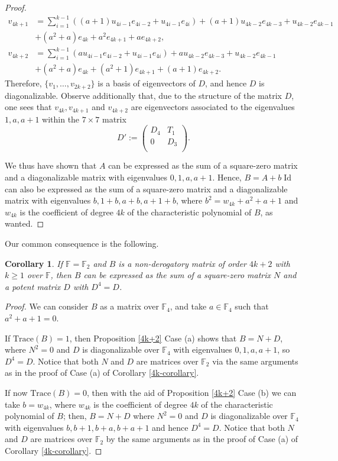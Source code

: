 \documentclass{amsart}
\DeclareMathOperator{\Id}{Id}
\def\FF{\mathbb{F}}
\newtheorem{corollary}[theorem]{Corollary}
\theoremstyle{definition}
\theoremstyle{remark}
\numberwithin{equation}{section}
\begin{document}
\begin{proof}
\begin{align*}
  v_{4k+1}&=\sum_{i=1}^{k-1} ( (a+1)u_{4i-1}e_{4i-2}+ u_{4i-1} e_{4i})+(a+1)u_{4k-2} e_{4k-3} +u_{4k-2} e_{4k-1}\\&  +(a^2+a)e_{4k}+a^2e_{4k+1}+a e_{4k+2},\\
  v_{4k+2}&=\sum_{i=1}^{k-1} ( a u_{4i-1}e_{4i-2}+ u_{4i-1} e_{4i})+a u_{4k-2} e_{4k-3} +u_{4k-2} e_{4k-1}\\&+(a^2+a)e_{4k}+(a^2+1) e_{4k+1}+(a+1) e_{4k+2}.
\end{align*}
Therefore, $\{v_1,\dots, v_{2k+2}\}$ is a basis of eigenvectors of $D$, and hence $D$ is diagonalizable. Observe additionally that, due to the structure of the matrix
$D$, one sees that $v_{4k}, v_{4k+1}$ and $ v_{4k+2}$ are eigenvectors associated to the eigenvalues $1,a,a+1$ within the $7\times 7$ matrix
$$D':=\left(
  \begin{array}{cc}
    D_4 & T_1 \\
    0 & D_3 \\
  \end{array}
\right).
$$

We thus have shown that $A$ can be expressed as the sum of a square-zero matrix and a diagonalizable matrix with eigenvalues $0,1,a, a+1$. Hence, $B=A+b \Id$ can also be expressed as the sum of a square-zero matrix and a diagonalizable matrix with eigenvalues $b,1+b,a+b, a+1+b$, where $b^2 =w_{4k}+a^2+a+1$ and $w_{4k}$ is the coefficient of degree $4k$ of the characteristic polynomial of $B$, as wanted.
\end{proof}

Our common consequence is the following.

\begin{corollary}\label{4k+2-corollary}
If $\FF=\FF_2$ and $B$ is a non-derogatory matrix of order $4k+2$ with $k\ge 1$ over $\FF$, then $B$ can be expressed as the sum of a square-zero matrix $N$ and a potent matrix $D$ with $D^4=D$.
\end{corollary}

\begin{proof} We can consider $B$ as a matrix over $\FF_4$, and take $a\in \FF_4$ such that $a^2+a+1=0$.

If $\text{Trace}(B)=1$, then Proposition \ref{4k+2} Case (a) shows that $B=N+D$, where $N^2=0$ and $D$ is diagonalizable over $\FF_4$ with eigenvalues $0, 1, a, a+1$, so $D^4=D$. Notice that both $N$ and $D$ are matrices over $\FF_2$ via the same arguments as in the proof of Case (a) of Corollary \ref{4k-corollary}.

If now $\text{Trace}(B)=0$, then with the aid of Proposition \ref{4k+2} Case (b) we can take $b =w_{4k}$, where $w_{4k}$ is the coefficient of degree $4k$ of the characteristic polynomial of $B$; then, $B=N+D$ where $N^2=0$ and $D$ is diagonalizable over $\FF_4$ with eigenvalues $b,b+1,b+a,b+a+1$ and hence $D^4=D$. Notice that both $N$ and $D$ are matrices over $\FF_2$ by the same arguments as in the proof of Case (a) of Corollary \ref{4k-corollary}.
\end{proof}
\end{document}

